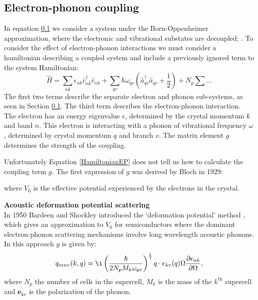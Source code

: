 
\subsection{Electron-phonon coupling}
In equation \ref{} we consider a system under the Born-Oppenheimer approximation, where the electronic and vibrational substates are decoupled; $ $.%
To consider the effect of electron-phonon interactions we must consider a hamiltonian describing a coupled system and include a previously ignored term to the system Hamiltonian:\cite{Giustino2017}
\begin{equation} \label{HamiltonianEP}
    \hat{H} = \sum_{nk}\epsilon_{nk}\hat{c}^{\dagger}_{nk}\hat{c}_{nk} + \sum_{qv}\hbar\omega_{qv}(\hat{a}^{\dagger}_{qv}\hat{a}_{qv}+\frac{1}{2})+N_p\sum...
\end{equation}
The first two terms describe the separate electron and phonon sub-systems, as seen in Section \ref{}. The third term describes the electron-phonon interaction. The electron has an energy eigenvalue $\epsilon$, determined by the crystal momentum $k$ and band $n$. This electron is interacting with a phonon of vibrational frequency $\omega$  , determined by crystal momentum $q$ and branch $v$. The matrix element $g$ determines the strength of the coupling. 

Unfortunately Equation \ref{HamiltonianEP} does not tell us how to calculate the coupling term $g$. The first expression of $g$ was derived by Bloch in 1929:
    
where $V_0$ is the effective potential experienced by the electrons in the crystal.

\textbf{Acoustic deformation potential scattering}\\
 In 1950 Bardeen and Shockley introduced the `deformation potential' method \cite{}, which gives an approximation to $V_0$ for semiconductors where the dominant electron-phonon scattering mechanisms involve long wavelength acoustic phonons.\cite{Giustino2017} In this approach $g$ is given by:
\begin{equation} \label{couplingterm}  %
   q_{mnv}(k,q) = \i\left(\frac{\hbar}{2N_pM_k\omega_{qv}}\right)^{\frac{1}{2}}q\cdot e_{kv}(q) \Omega\frac{\partial\epsilon_{nk}}{\partial\Omega},
\end{equation}
where $N_p$ the number of cells in the supercell, $M_k$ is the mass of the $k^{\textrm{th}}$ supercell and $\textbf{e}_\textrm{{kv}}$ is the polarization of the phonon. 


